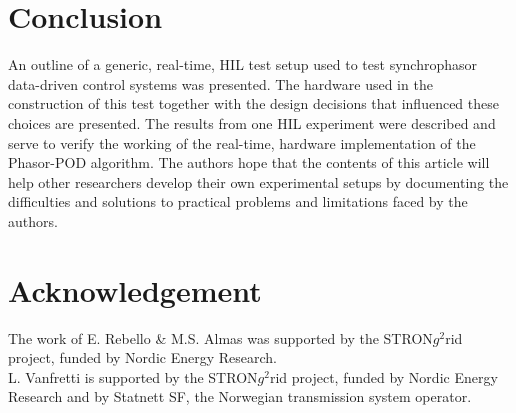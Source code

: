 \documentclass[conference]{IEEEtran}
\begin{document}
\section{Conclusion} \label{conclusion}
An outline of a generic, real-time, HIL test setup used to test synchrophasor data-driven control systems was presented. The hardware used in the construction of this test together with the design decisions that influenced these choices are presented. The results from one HIL experiment were described and serve to verify the working of the real-time, hardware implementation of the Phasor-POD algorithm. The authors hope that the contents of this article will help other researchers develop their own experimental setups by documenting the difficulties and solutions to practical problems and limitations faced by the authors.

\section*{Acknowledgement}
The work of E. Rebello \& M.S. Almas was supported by the STRON$g^{2}$rid project, funded by Nordic Energy Research.\\
L. Vanfretti is supported by the STRON$g^{2}$rid project, funded by Nordic Energy Research and by Statnett SF, the Norwegian transmission system operator.

%
%
%
\end{document}
